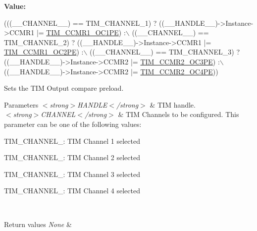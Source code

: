{\bfseries Value\+:}
\begin{DoxyCode}
(((\_\_CHANNEL\_\_) == TIM\_CHANNEL\_1) ? ((\_\_HANDLE\_\_)->Instance->CCMR1 |= 
      \hyperlink{group___peripheral___registers___bits___definition_ga1aa54ddf87a4b339881a8d5368ec80eb}{TIM\_CCMR1\_OC1PE}) :\(\backslash\)
         ((\_\_CHANNEL\_\_) == TIM\_CHANNEL\_2) ? ((\_\_HANDLE\_\_)->Instance->CCMR1 |= 
      \hyperlink{group___peripheral___registers___bits___definition_gabddbf508732039730125ab3e87e9d370}{TIM\_CCMR1\_OC2PE}) :\(\backslash\)
         ((\_\_CHANNEL\_\_) == TIM\_CHANNEL\_3) ? ((\_\_HANDLE\_\_)->Instance->CCMR2 |= 
      \hyperlink{group___peripheral___registers___bits___definition_ga276fd2250d2b085b73ef51cb4c099d24}{TIM\_CCMR2\_OC3PE}) :\(\backslash\)
         ((\_\_HANDLE\_\_)->Instance->CCMR2 |= \hyperlink{group___peripheral___registers___bits___definition_ga3e951cd3f6593e321cf79b662a1deaaa}{TIM\_CCMR2\_OC4PE}))
\end{DoxyCode}


Sets the T\+IM Output compare preload. 


\begin{DoxyParams}{Parameters}
{\em $<$strong$>$\+H\+A\+N\+D\+L\+E$<$/strong$>$} & T\+IM handle. \\
\hline
{\em $<$strong$>$\+C\+H\+A\+N\+N\+E\+L$<$/strong$>$} & T\+IM Channels to be configured. This parameter can be one of the following values\+: \begin{DoxyItemize}
\item T\+I\+M\+\_\+\+C\+H\+A\+N\+N\+E\+L\+\_\+: T\+IM Channel 1 selected \item T\+I\+M\+\_\+\+C\+H\+A\+N\+N\+E\+L\+\_\+: T\+IM Channel 2 selected \item T\+I\+M\+\_\+\+C\+H\+A\+N\+N\+E\+L\+\_\+: T\+IM Channel 3 selected \item T\+I\+M\+\_\+\+C\+H\+A\+N\+N\+E\+L\+\_\+: T\+IM Channel 4 selected \end{DoxyItemize}
\\
\hline
\end{DoxyParams}

\begin{DoxyRetVals}{Return values}
{\em None} & \\
\hline
\end{DoxyRetVals}
\mbox{\label{group___t_i_m___exported___macros_gaa7a5c7645695bad15bacd402513a028a}} 
